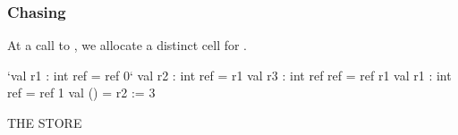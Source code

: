 \documentclass[aspectratio=169]{beamer}
\newcommand{\topthing}[2]{
      \begin{minipage}[t][#1][t]{\textwidth}
        \vspace{\fill}
        #2
        \vspace{\fill}
      \end{minipage}
    }
\begin{document}
\begin{frame}[fragile]
  \frametitle{ Chasing}

  \topthing{0.2in}{
    At a call to \code{ref}, we allocate a distinct \code{ref} cell for \code{r1}.
  }

  \vspace{10pt}

  \begin{center}
    \begin{minipage}[t][2.1in][t]{0.6\textwidth}
      \vspace{\fill}
      \begin{codeblock}
        `val r1 : int ref     = ref 0`
        val r2 : int ref     = r1
        val r3 : int ref ref = ref r1
        val r1 : int ref     = ref 1
        val ()               = r2 := 3
      \end{codeblock}
      \vspace{\fill}
    \end{minipage}
    \hfill\vline\hfill
    \begin{minipage}[t][2.1in][t]{0.3\textwidth}
      \centering
      {\hspace{-20pt}\color{gray} \large THE STORE}

      \vspace{\fill}
      \vspace{\fill}
    \end{minipage}
  \end{center}
\end{frame}
\end{document}
